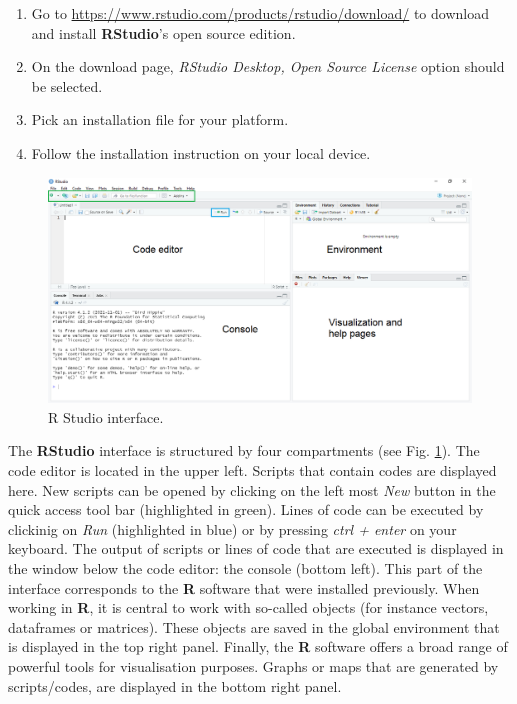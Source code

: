 \documentclass[
  10pt,
  b5paper,
  oneside]{book}
\providecommand{\tightlist}{%
  \setlength{\itemsep}{0pt}\setlength{\parskip}{0pt}}
\begin{document}
\begin{enumerate}
\def\labelenumi{\arabic{enumi}.}
\tightlist
\item
  Go to \url{https://www.rstudio.com/products/rstudio/download/} to download and install \textbf{RStudio}'s open source edition.
\item
  On the download page, \emph{RStudio Desktop, Open Source License} option should be selected.
\item
  Pick an installation file for your platform.
\item
  Follow the installation instruction on your local device.
\end{enumerate}

\begin{figure}
\includegraphics[width=18.97in]{images/2_RStudio-interface} \caption{R Studio interface.}\label{fig:Rstudio}
\end{figure}

The \textbf{RStudio} interface is structured by four compartments (see Fig. \ref{fig:Rstudio}). The code editor is located in the upper left. Scripts that contain codes are displayed here. New scripts can be opened by clicking on the left most \emph{New} button in the quick access tool bar (highlighted in green). Lines of code can be executed by clickinig on \emph{Run} (highlighted in blue) or by pressing \emph{ctrl + enter} on your keyboard.
The output of scripts or lines of code that are executed is displayed in the window below the code editor: the console (bottom left). This part of the interface corresponds to the \textbf{R} software that were installed previously.
When working in \textbf{R}, it is central to work with so-called objects (for instance vectors, dataframes or matrices). These objects are saved in the global environment that is displayed in the top right panel.
Finally, the \textbf{R} software offers a broad range of powerful tools for visualisation purposes. Graphs or maps that are generated by scripts/codes, are displayed in the bottom right panel.
\end{document}
